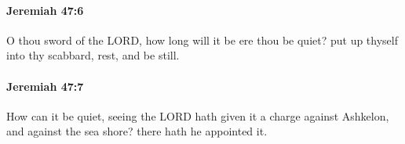 		\paragraph{Jeremiah 47:6} %
			\label{JEREMIAH-47-6}

			O thou sword of the LORD, how long will it be ere thou be quiet? put up thyself into thy scabbard, rest, and be still.


		\paragraph{Jeremiah 47:7} %
			\label{JEREMIAH-47-7}

			How can it be quiet, seeing the LORD hath given it a charge against Ashkelon, and against the sea shore? there hath he appointed it.

